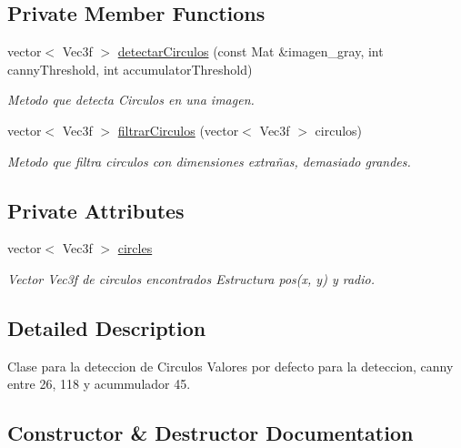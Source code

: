 \subsection*{Private Member Functions}
\begin{DoxyCompactItemize}
\item 
vector$<$ Vec3f $>$ \hyperlink{classCDetectarCirculo_ad6b02b2bc1fbb78ce6d1c1a5d51522f6}{detectar\+Circulos} (const Mat \&imagen\+\_\+gray, int canny\+Threshold, int accumulator\+Threshold)
\begin{DoxyCompactList}\small\item\em Metodo que detecta Circulos en una imagen. \end{DoxyCompactList}\item 
vector$<$ Vec3f $>$ \hyperlink{classCDetectarCirculo_adc8cdab3f0446334d56e9ac08b304639}{filtrar\+Circulos} (vector$<$ Vec3f $>$ circulos)
\begin{DoxyCompactList}\small\item\em Metodo que filtra circulos con dimensiones extrañas, demasiado grandes. \end{DoxyCompactList}\end{DoxyCompactItemize}
\subsection*{Private Attributes}
\begin{DoxyCompactItemize}
\item 
vector$<$ Vec3f $>$ \hyperlink{classCDetectarCirculo_afb2bd271bd772e489fe948caa80bb7b7}{circles}
\begin{DoxyCompactList}\small\item\em Vector Vec3f de circulos encontrados Estructura pos(x, y) y radio. \end{DoxyCompactList}\end{DoxyCompactItemize}


\subsection{Detailed Description}
Clase para la deteccion de Circulos Valores por defecto para la deteccion, canny entre 26, 118 y acummulador 45. 

\subsection{Constructor \& Destructor Documentation}
